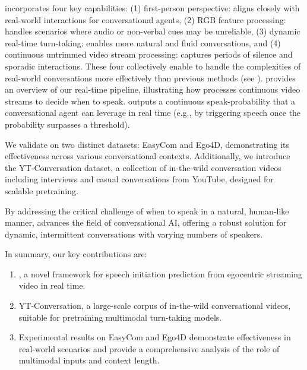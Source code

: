 \frameworkname incorporates four key capabilities: (1) first-person perspective: aligns closely with real-world interactions for conversational agents, (2) RGB feature processing: handles scenarios where audio or non-verbal cues may be unreliable, (3) dynamic real-time turn-taking: enables more natural and fluid conversations, and (4) continuous untrimmed video stream processing: captures periods of silence and sporadic interactions. These four collectively enable \frameworkname to handle the complexities of real-world conversations more effectively than previous methods (see ).  provides an overview of our real-time pipeline, illustrating how \frameworkname processes continuous video streams to decide when to speak. \frameworkname outputs a continuous speak-probability that a conversational agent can leverage in real time (e.g., by triggering speech once the probability surpasses a threshold).


We validate \frameworkname on two distinct datasets: EasyCom and Ego4D, demonstrating its effectiveness across various conversational contexts. Additionally, we introduce the YT-Conversation dataset, a collection of in-the-wild conversation videos including interviews and casual conversations from YouTube, designed for scalable pretraining.  

By addressing the critical challenge of when to speak in a natural, human-like manner, \frameworkname advances the field of conversational AI, offering a robust solution for dynamic, intermittent conversations with varying numbers of speakers.  

In summary, our key contributions are:
\begin{enumerate}[nosep, leftmargin=*]

\item \frameworkname, a novel framework for speech initiation prediction from egocentric streaming video in real time.
\item YT-Conversation, a large-scale corpus of in-the-wild conversational videos, suitable for 
pretraining multimodal turn-taking models.
\item Experimental results on EasyCom and Ego4D demonstrate effectiveness in real-world scenarios and provide a comprehensive analysis of the role of multimodal inputs and context length. 

\end{enumerate}



























